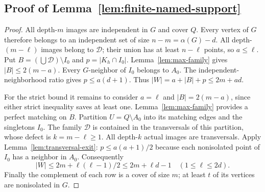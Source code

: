 \documentclass[11pt]{article}
\theoremstyle{definition}
\theoremstyle{plain}
\begin{document}
\subsection*{Proof of Lemma~\ref{lem:finite-named-support}}
\begin{proof}
All depth-$m$ images are independent in $G$ and cover $Q$.
Every vertex of $G$ therefore belongs to an independent set of size
$n-m=\alpha(G)-d$.
All depth-$(m-\ell)$ images belong to $\mathcal D$; their union has
at least $n-\ell$ points, so $a\le\ell$.
Put $B=(\bigcup\mathcal D)\setminus I_0$ and
$p=|K_h\cap I_0|$. Lemma~\ref{lem:max-family} gives
$|B|\le2(m-a)$. Every $G$-neighbor of $I_0$ belongs to $A_0$.
The independent-neighborhood ratio gives $p\le a(d+1)$.
Thus $|W|=a+|B|+p\le2m+ad$.

For the strict bound it remains to consider $a=\ell$ and
$|B|=2(m-a)$, since either strict inequality saves at least one.
Lemma~\ref{lem:max-family} provides a perfect matching on $B$.
Partition $U=Q\setminus A_0$ into its matching edges and the
singletons $I_0$. The family $\mathcal D$ is contained in the
transversals of this partition, whose defect is $k=m-\ell\ge1$.
All depth-$k$ actual images are transversals. Apply
Lemma~\ref{lem:transversal-exit}: $p\le a(a+1)/2$ because each
nonisolated point of $I_0$ has a neighbor in $A_0$.
Consequently
\[
 |W|\le2m+\ell(\ell-1)/2\le2m+\ell d-1
 \quad(1\le\ell\le2d).
\]
Finally the complement of each row is a cover of size $m$;
at least $t$ of its vertices are nonisolated in $G$.
\end{proof}
\end{document}
